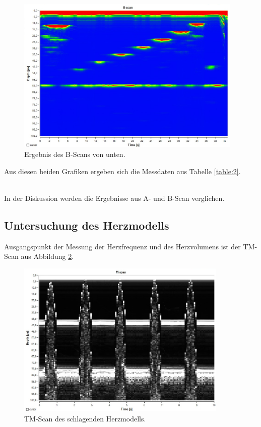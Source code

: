 \begin{figure}[H]
  \centering
  \includegraphics[height=7.5cm]{messdaten/b_unten.png}
  \caption{Ergebnis des B-Scans von unten.}
  \label{figure:2}
\end{figure}

Aus diesen beiden Grafiken ergeben sich die Messdaten aus Tabelle \ref{table:2}.

\\In der Diskussion werden die Ergebnisse aus A- und B-Scan verglichen.

\subsection{Untersuchung des Herzmodells}

Ausgangspunkt der Messung der Herzfrequenz und des Herzvolumens ist der TM-Scan aus Abbildung \ref{figure:3}.

\begin{figure}[H]
  \centering
  \includegraphics[height=7.5cm]{messdaten/herz.png}
  \caption{TM-Scan des schlagenden Herzmodells.}
  \label{figure:3}
\end{figure}





